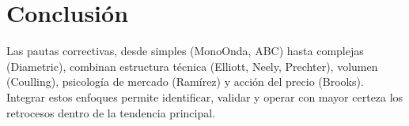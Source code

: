 \section{Conclusi\'on}

Las pautas correctivas, desde simples (MonoOnda, ABC) hasta complejas (Diametric), combinan estructura t\'ecnica (Elliott, Neely, Prechter), volumen (Coulling), psicolog\'ia de mercado (Ram\'irez) y acci\'on del precio (Brooks). Integrar estos enfoques permite identificar, validar y operar con mayor certeza los retrocesos dentro de la tendencia principal.
